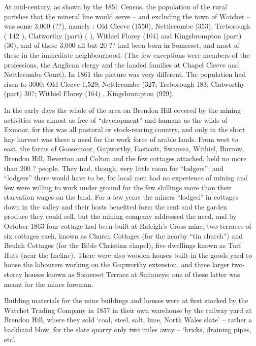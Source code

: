 \documentclass[10pt,a4paper]{article}
\begin{document}
At mid-century, as shown by the 1851 Census, the population of the rural parishes that the mineral line would serve – and excluding the town  of Watchet – was some 3,000 (??), namely : Old Cleeve  (1550), Nettlecombe (353), Treborough ( 142  ), Clatworthy (part) (        ), Withiel Florey (104)  and Kingsbrompton (part) (30), and of those 3,000  all  but 20 ?? had been born in Somerset, and most of these in the immediate neighbourhood.  (The few exceptions were members of the professions, the Anglican clergy and the landed families at Chapel Cleeve and Nettlecombe Court). In 1861 the picture was very different. The population had risen to 3000: Old Cleeve 1,529; Nettlecombe (327; Treborough 183; Clatworthy (part)  30?; Withiel Florey  (164) , Kingsbrompton (929). 

In the early days the whole of the area on Brendon Hill covered by the mining activities was almost as free of “development” and humans as the wilds of Exmoor, for this was all pastoral or stock-rearing country, and only in the short hay harvest was there a need for the work force of arable lands. From west to east, the farms of Goosemoor, Gupworthy, Eastcott, Swansea, Withiel, Burrow, Brendon Hill, Beverton and Colton and the few cottages attached, held no more than 200 ?    people.   They had, though, very little room for “lodgers”; and “lodgers” there would have to be, for local men had no experience of mining and few were willing to work under ground for the few shillings more than their starvation wages on the land. For a few years the miners “lodged” in cottages down in the valley and their hosts benefited form the rent and the garden produce they could sell, but the mining company addressed the need, and by October 1863 four cottage had been built at Raleigh’s Cross mine, two  terraces of six cottages each, known as Church Cottages (for the nearby “tin church”) and Beulah Cottages (for the Bible Christian chapel), five dwellings known as Turf Huts (near the Incline). There were also wooden houses built in the goods yard to house the labourers working on the Gupworthy extension, and three larger two-storey houses known as Somerset Terrace at Sminneys; one of these latter was meant for the mines foreman. 

Building materials for the mine buildings and houses were at first stocked by the Watchet Trading Company in 1857 in their own warehouse by the railway yard at Brendon Hill, where they sold ‘coal, steel, salt, lime, North Wales slate’ – rather a backhand blow, for the slate quarry only two miles away – ‘bricks, draining pipes, etc’.
\end{document}
